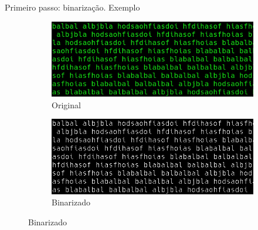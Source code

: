 \documentclass{beamer}
\begin{document}
\begin{frame}[allowframebreaks]{Primeiro passo: binarização. Exemplo}

\begin{figure}
    \centering
    \begin{subfigure}[]{0.49\textwidth}
        \centering
        \includegraphics[width=\textwidth]{images/terminal.png}
        \caption{Original}
    \end{subfigure}
    \begin{subfigure}[]{0.49\textwidth}
        \centering
        \includegraphics[width=\textwidth]{images/terminal_bin.png}
        \caption{Binarizado}
    \end{subfigure}
\end{figure}

\framebreak


\end{frame}
\end{document}
